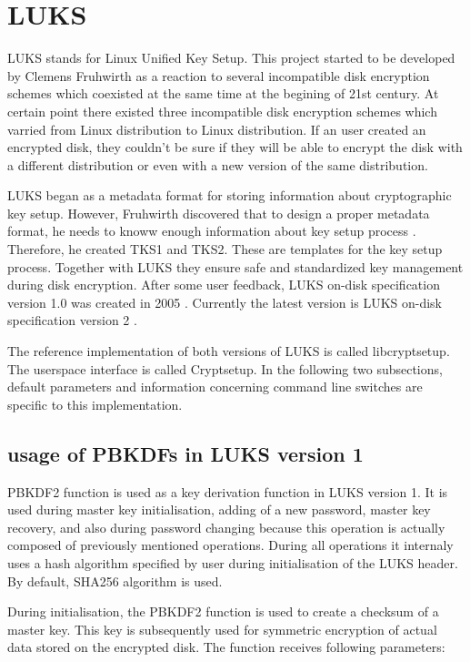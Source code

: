 \documentclass[nolof]{fithesis3}
\begin{document}
\section{LUKS}
LUKS stands for Linux Unified Key Setup. This project started to be developed by Clemens Fruhwirth as a reaction to several incompatible disk encryption schemes which coexisted at the same time at the begining of 21st century. At certain point there existed three incompatible disk encryption schemes which varried from Linux distribution to Linux distribution. If an user created an encrypted disk, they couldn't be sure if they will be able to encrypt the disk with a different distribution or even with a new version of the same distribution.

LUKS began as a metadata format for storing information about cryptographic key setup. However, Fruhwirth discovered that to design a proper metadata format, he needs to knoww enough information about key setup process \parencite{newmethods}. Therefore, he created TKS1 and TKS2. These are templates for the key setup process. Together with LUKS they ensure safe and standardized key management during disk encryption. After some user feedback, LUKS on-disk specification version 1.0 was created in 2005 \parencite{luks1}. Currently the latest version is LUKS on-disk specification version 2 \parencite{luks2}.

The reference implementation of both versions of LUKS is called libcryptsetup. The userspace interface is called Cryptsetup. In the following two subsections, default parameters and information concerning command line switches are specific to this implementation.

\subsection{usage of PBKDFs in LUKS version 1}
\label{luks1}
PBKDF2 function is used as a key derivation function in LUKS version 1. It is used during master key initialisation, adding of a new password, master key recovery, and also during password changing because this operation is actually composed of previously mentioned operations. During all operations it internaly uses a hash algorithm specified by user during initialisation of the LUKS header. By default, SHA256 algorithm is used.

During initialisation, the PBKDF2 function is used to create a checksum of a master key. This key is subsequently used for symmetric encryption of actual data stored on the encrypted disk. The function receives following parameters:
\end{document}

